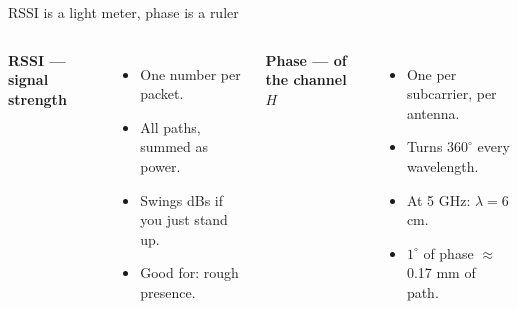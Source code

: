 \begin{frame}{RSSI is a light meter, phase is a ruler}
  \vspace{0.4em}
  \begin{columns}[T,onlytextwidth]
      {\small\textbf{\textcolor{softgray}{RSSI --- signal strength}}\par}
      \vspace{0.4em}
      {\small
       \begin{itemize}\itemsep4pt
         \item One number per packet.
         \item All paths, summed as power.
         \item Swings dBs if you just stand up.
         \item Good for: rough presence.
       \end{itemize}\par}
      {\small\textbf{\textcolor{ranblue}{Phase --- of the channel $H$}}\par}
      \vspace{0.4em}
      {\small
       \begin{itemize}\itemsep4pt
         \item One per subcarrier, per antenna.
         \item Turns $360^\circ$ every wavelength.
         \item At 5 GHz: $\lambda = 6$ cm.
         \item $1^\circ$ of phase $\approx$ 0.17 mm of path.
       \end{itemize}\par}
  \end{columns}

  \vspace{0.8em}

\end{frame}
